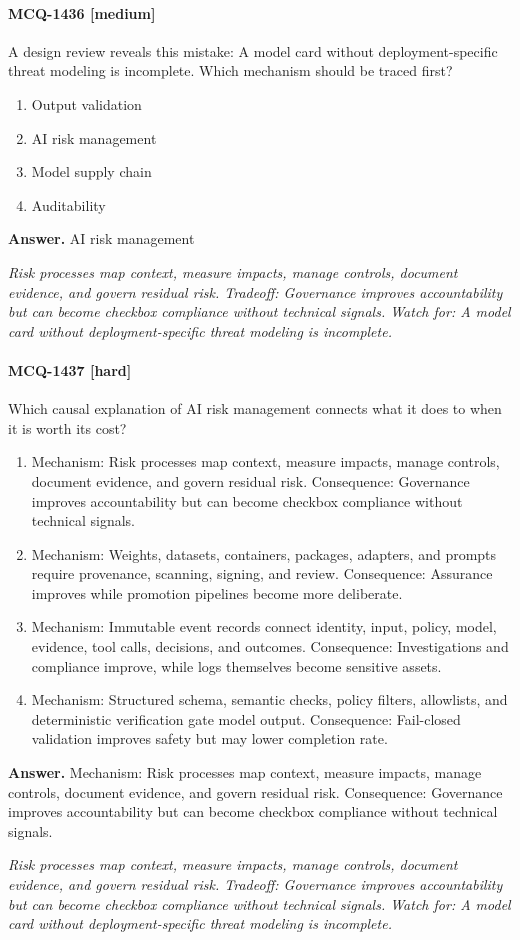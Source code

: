 \paragraph{MCQ-1436 [medium]} A design review reveals this mistake: A model card without deployment-specific threat modeling is incomplete. Which mechanism should be traced first?
\begin{enumerate}[label=\Alph*.]
\item Output validation
\item AI risk management
\item Model supply chain
\item Auditability
\end{enumerate}
\noindent\textbf{Answer.} AI risk management
\par\textit{Risk processes map context, measure impacts, manage controls, document evidence, and govern residual risk. Tradeoff: Governance improves accountability but can become checkbox compliance without technical signals. Watch for: A model card without deployment-specific threat modeling is incomplete.}
\paragraph{MCQ-1437 [hard]} Which causal explanation of AI risk management connects what it does to when it is worth its cost?
\begin{enumerate}[label=\Alph*.]
\item Mechanism: Risk processes map context, measure impacts, manage controls, document evidence, and govern residual risk. Consequence: Governance improves accountability but can become checkbox compliance without technical signals.
\item Mechanism: Weights, datasets, containers, packages, adapters, and prompts require provenance, scanning, signing, and review. Consequence: Assurance improves while promotion pipelines become more deliberate.
\item Mechanism: Immutable event records connect identity, input, policy, model, evidence, tool calls, decisions, and outcomes. Consequence: Investigations and compliance improve, while logs themselves become sensitive assets.
\item Mechanism: Structured schema, semantic checks, policy filters, allowlists, and deterministic verification gate model output. Consequence: Fail-closed validation improves safety but may lower completion rate.
\end{enumerate}
\noindent\textbf{Answer.} Mechanism: Risk processes map context, measure impacts, manage controls, document evidence, and govern residual risk. Consequence: Governance improves accountability but can become checkbox compliance without technical signals.
\par\textit{Risk processes map context, measure impacts, manage controls, document evidence, and govern residual risk. Tradeoff: Governance improves accountability but can become checkbox compliance without technical signals. Watch for: A model card without deployment-specific threat modeling is incomplete.}
